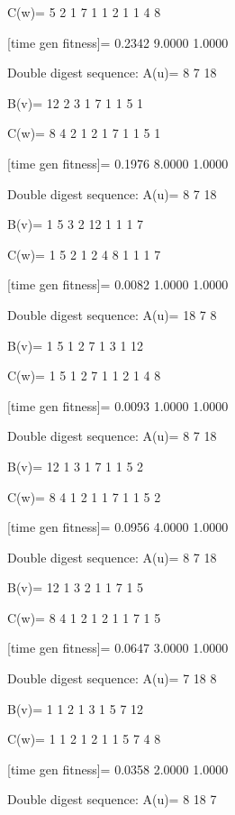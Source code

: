 C(w)=
     5     2     1     7     1     1     2     1     1     4     8

[time gen fitness]=
    0.2342    9.0000    1.0000

Double digest sequence:
A(u)=
     8     7    18

B(v)=
    12     2     3     1     7     1     1     5     1

C(w)=
     8     4     2     1     2     1     7     1     1     5     1

[time gen fitness]=
    0.1976    8.0000    1.0000

Double digest sequence:
A(u)=
     8     7    18

B(v)=
     1     5     3     2    12     1     1     1     7

C(w)=
     1     5     2     1     2     4     8     1     1     1     7

[time gen fitness]=
    0.0082    1.0000    1.0000

Double digest sequence:
A(u)=
    18     7     8

B(v)=
     1     5     1     2     7     1     3     1    12

C(w)=
     1     5     1     2     7     1     1     2     1     4     8

[time gen fitness]=
    0.0093    1.0000    1.0000

Double digest sequence:
A(u)=
     8     7    18

B(v)=
    12     1     3     1     7     1     1     5     2

C(w)=
     8     4     1     2     1     1     7     1     1     5     2

[time gen fitness]=
    0.0956    4.0000    1.0000

Double digest sequence:
A(u)=
     8     7    18

B(v)=
    12     1     3     2     1     1     7     1     5

C(w)=
     8     4     1     2     1     2     1     1     7     1     5

[time gen fitness]=
    0.0647    3.0000    1.0000

Double digest sequence:
A(u)=
     7    18     8

B(v)=
     1     1     2     1     3     1     5     7    12

C(w)=
     1     1     2     1     2     1     1     5     7     4     8

[time gen fitness]=
    0.0358    2.0000    1.0000

Double digest sequence:
A(u)=
     8    18     7


